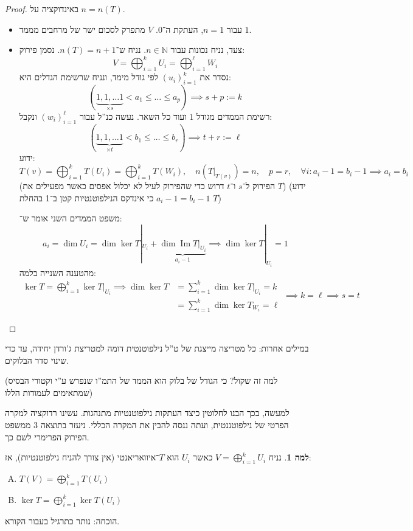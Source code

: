 \documentclass[a4paper]{article}
\newcommand\envendproof{\vspace{-16pt}}
\newcommand\N     {\mathbb{N}}
\newcommand\ml    {\ell}
\DeclareMathOperator\Img   {Im}
\newcommand\co        {\colon}
\newcommand\cl [1]    {\left ( #1 \right )}
\theoremstyle{definition}
\newtheorem{Lemma}{\color{myyellow}למה}
\newcommand\lem   [1] {\begin{Lemma}#1\end{Lemma}}
\begin{document}
	\begin{proof}
		באינדוקציה על $n  = n(T)$. 
		\begin{itemize}
			\item עבור $n = 1$, העתקת ה־‏$0$. $V$ מתפרק לסכום ישר של מרחבים מממד $1$. 
			\item צעד, נניח נכונות עבור $n \in \N$. נניח ש־$n(T) = n + 1$. נסמן פירוק: 
			\[ V = \bigoplus_{i = 1}^{k} U_i = \bigoplus_{i = 1}^{\ml} W_i \]
			נסדר את $(u_i)_{i =1}^{k}$ לפי גודל מימד, ונניח שרשימת הגדלים היא: 
			\[ (\underbrace{1, 1, \dots 1 }_{\times s}< a_1 \le \dots \le a_{p}) \implies s + p := k \]
			רשימת הממדים מגודל $1$ ועוד כל השאר. נעשה כנ''ל עבור $(w_i)_{i = 1}^{\ml}$ ונקבל: 
			\[ (\underbrace{1, 1, \dots 1}_{\times t} < b_1 \le \dots \le b_r) \implies t + r := \ml \]
			ידוע:
			\[ T(v) = \bigoplus_{i = 1}^{k} T(U_i) = \bigoplus_{i = 1}^{k} T(W_i), \quad n\cl{T|_{{T(v)}}} = n, \quad p = r, \quad \forall i \co a_i - 1 = b_i - 1 \implies a_i = b_i \]
			(הפירוק ל־$s$ ו־$t$ דרוש כדי שהפירוק לעיל לא יכלול אפסים כאשר מפעילים את $T$)
			(ידוע $a_i - 1 = b_i - 1$ כי אינדקס הנילפוטנטיות קטן ב־1 בהחלת $T$)
			
			משפט הממדים השני אומר ש־: 
			\[ a_i = \dim U_i = \dim \ker T|_{{U_i}} + \underbrace{\dim \Img T|_{{U_i}}}_{a_i - 1} \implies \dim \ker T|_{{U_i}} = 1 \]
			מהטענה השנייה בלמה: 
			\[ \begin{aligned}
				\ker T = \bigoplus_{i = 1}^{k} \ker T|_{{U_i}} \implies \dim \ker T &= \sum_{i = 1}^k \dim \ker T|_{{U_i}} = k \\
				&= \sum_{i = 1}^{k} \dim \ker T_{W_i} = \ml
			\end{aligned}\implies k = \ml \implies s = t \]
		\end{itemize}\envendproof
	\end{proof}
	
	במילים אחרות: כל מטריצה מייצגת של ט''ל נילפוטנטית דומה למטריצת ג'ורדן יחידה, עד כדי שינוי סדר הבלוקים. 
	
	(למה זה שקול? כי הגודל של בלוק הוא הממד של התמ''ו שנפרש ע''י וקטורי הבסיס שמתאימים לעמודות הללו)
	
	למעשה, בכך הבנו לחלוטין כיצד העתקות נילפוטנטיות מתנהגות. עשינו רדוקציה למקרה הפרטי של נילפוטננטית, ועתה ננסה להבין את המקרה הכללי. ניעזר בתוצאה 3 ממשפט הפירוק הפרימרי לשם כך. 
	
	\lem{נניח $V = \bigoplus_{i = 1}^{k} U_i$ כאשר $U_i$ הוא $T$־איוואריאנטי (אין צורך להניח נילפוטנטיות), אז: 
		\begin{enumerate}[A.]
			\item \hfil $\displaystyle T(V) = \bigoplus_{i = 1}^{k}T(U_i)$
			\item \hfil $\displaystyle \ker T = \bigoplus_{i = 1}^k \ker T(U_i)$
	\end{enumerate}}
	הוכחה: נותר כתרגיל בעבור הקורא. 
	
\end{document}
